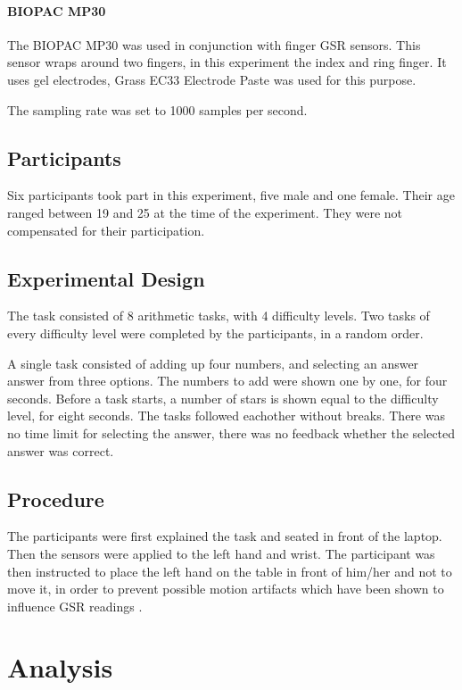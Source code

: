 \documentclass[11pt,leqno,a4paper]{report} %
\begin{document}
\paragraph{BIOPAC MP30}
The BIOPAC MP30 was used in conjunction with finger GSR sensors. This sensor wraps around two fingers, in this experiment the index and ring finger. It uses gel electrodes, Grass EC33 Electrode Paste was used for this purpose.

The sampling rate was set to 1000 samples per second.

\subsection{Participants}
Six participants took part in this experiment, five male and one female. Their age ranged between 19 and 25 at the time of the experiment. They were not compensated for their participation.


\subsection{Experimental Design}
The task consisted of 8 arithmetic tasks, with 4 difficulty levels. Two tasks of every difficulty level were completed by the participants, in a random order. 

A single task consisted of adding up four numbers, and selecting an answer answer from three options. The numbers to add were shown one by one, for four seconds. Before a task starts, a number of stars is shown equal to the difficulty level, for eight seconds. The tasks followed eachother without breaks. There was no time limit for selecting the answer, there was no feedback whether the selected answer was correct.


\subsection{Procedure}
The participants were first explained the task and seated in front of the laptop. Then the sensors were applied to the left hand and wrist. The participant was then instructed to place the left hand on the table in front of him/her and not to move it, in order to prevent possible motion artifacts which have been shown to influence GSR readings \citep{motionart}.

\section{Analysis}
\end{document}
